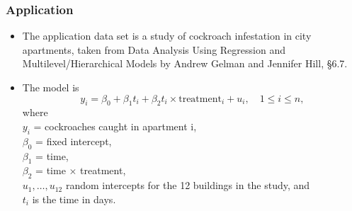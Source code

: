 \documentclass{beamer}
\begin{document}
			
	\begin{frame}
		\frametitle{Application}
		\begin{itemize}
			\item The application data set is a study of cockroach infestation in city apartments, taken from
			      Data Analysis Using Regression and Multilevel/Hierarchical Models by Andrew Gelman and Jennifer
			      Hill, \S 6.7.
			\item The model is $$y_i = \beta_0 + \beta_1 t_i + \beta_2 t_i \times \text{treatment}_i + u_i, \quad 1 \leq i \leq n,$$ 
			      where\\
			      $y_i$ = cockroaches caught in apartment i, \\
			      $\beta_0$ = fixed intercept, \\
			      $\beta_1$ = time, \\
			      $\beta_2$ = time $\times$ treatment, \\
			      $u_1, \ldots, u_{12}$ random intercepts for the 12 buildings in the study, and \\
			      $t_i$ is the time in days.\\
		\end{itemize}
	\end{frame}
		
\end{document}
